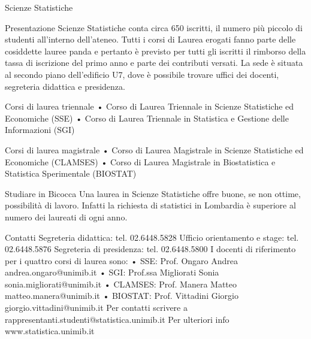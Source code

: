 Scienze Statistiche

Presentazione
Scienze Statistiche conta circa 650 iscritti, il numero più piccolo di studenti all'interno dell'ateneo. Tutti i corsi di Laurea erogati fanno parte delle cosiddette lauree panda e pertanto è previsto per tutti gli iscritti il rimborso della tassa di iscrizione del primo anno e parte dei contributi versati. 
La sede è situata al secondo piano dell'edificio U7, dove è possibile trovare uffici dei docenti, segreteria didattica e presidenza. 

Corsi di laurea triennale 
    • Corso di Laurea Triennale in Scienze Statistiche ed Economiche (SSE) 
    • Corso di Laurea Triennale in Statistica e Gestione delle Informazioni (SGI) 

Corsi di laurea magistrale
    • Corso di Laurea Magistrale in Scienze Statistiche ed Economiche (CLAMSES) 
    • Corso di Laurea Magistrale in Biostatistica e Statistica Sperimentale (BIOSTAT) 

Studiare in Bicocca
Una laurea in Scienze Statistiche offre buone, se non ottime, possibilità di lavoro. Infatti la richiesta di statistici in Lombardia è superiore al numero dei laureati di ogni anno. 

Contatti
Segreteria didattica: tel. 02.6448.5828 
Ufficio orientamento e stage: tel. 02.6448.5876
Segreteria di presidenza: tel. 02.6448.5800 
I docenti di riferimento per i quattro corsi di laurea sono: 
       • SSE: Prof. Ongaro Andrea andrea.ongaro@unimib.it 
       • SGI: Prof.ssa Migliorati Sonia sonia.migliorati@unimib.it 
       • CLAMSES: Prof. Manera Matteo matteo.manera@unimib.it 
       • BIOSTAT: Prof. Vittadini Giorgio giorgio.vittadini@unimib.it 
Per contatti scrivere a rappresentanti.studenti@statistica.unimib.it 
Per ulteriori info www.statistica.unimib.it 
